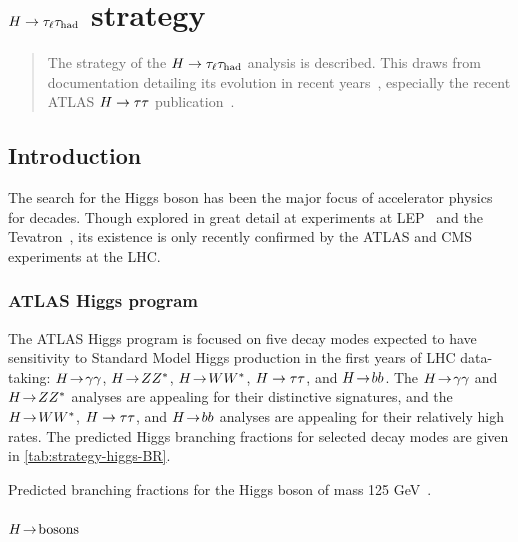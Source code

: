 \chapter[$\Htautaulh$ strategy][$\Htautaulh$ strategy]{$\Htautaulh$ strategy}
\label{chap:strategy}

\begin{quote}
  The strategy of the $\Htautaulh$ analysis is described. This draws from documentation detailing its evolution in recent years~\cite{ATLAS-CONF-2012-160,ATLAS-CONF-2013-108}, especially the recent ATLAS $H\rightarrow\tau\tau$ publication~\cite{HIGG-2013-32}.
\end{quote}

\section{Introduction}
\label{sec:strategy-introduction}

The search for the Higgs boson has been the major focus of accelerator physics for decades. Though explored in great detail at experiments at LEP~\cite{2003.lep-higgs} and the Tevatron~\cite{2013.tevatron-higgs}, its existence is only recently confirmed by the ATLAS and CMS experiments at the LHC.

\subsection{ATLAS Higgs program}
\label{sec:strategy-higgs}

The ATLAS Higgs program is focused on five decay modes expected to have sensitivity to Standard Model Higgs production in the first years of LHC data-taking: $H \!\rightarrow\! \gamma\gamma$, $H \!\rightarrow\! ZZ^\ast$, $H \!\rightarrow\! WW^\ast$, $H\rightarrow\tau\tau$, and $H \!\rightarrow\! bb$. The $H \!\rightarrow\! \gamma\gamma$ and $H \!\rightarrow\! ZZ^\ast$ analyses are appealing for their distinctive signatures, and the $H \!\rightarrow\! WW^\ast$, $H\rightarrow\tau\tau$, and $H \!\rightarrow\! bb$ analyses are appealing for their relatively high rates. The predicted Higgs branching fractions for selected decay modes are given in \cref{tab:strategy-higgs-BR}.

\begin{table}[htp]
  \centering
  \renewcommand{\arraystretch}{1.4}
  \caption{Predicted branching fractions for the Higgs boson of mass 125 GeV~\cite{higgs-branchingfractions}.}
  
  \label{tab:strategy-higgs-BR}
\end{table}

\subsubsection{$H \!\rightarrow\! \text{bosons}$}


